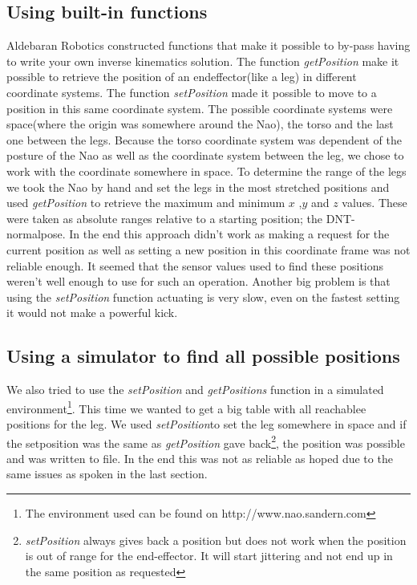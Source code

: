 \documentclass[a4paper]{article}
\begin{document}
\subsection{Using built-in functions}
Aldebaran Robotics constructed functions that make it possible to by-pass having
to write your own inverse kinematics solution. The function \emph{getPosition}
make it possible to retrieve the position of an endeffector(like a leg) in
different coordinate systems. The function  \emph{setPosition} made it possible
to move to a position in this same coordinate system. The possible coordinate
systems were space(where the origin was somewhere around the Nao), the torso
and the last one between the legs. Because the torso coordinate system was
dependent of the posture of the Nao as well as the coordinate system between
the leg, we chose to work with the coordinate somewhere in space.
To determine the range of the legs we took the Nao by hand and set the legs in
the most stretched positions and used \emph{getPosition} to retrieve the
maximum and minimum $x$ ,$y$ and $z$ values.  These were taken as absolute
ranges relative to a starting position; the DNT-normalpose.
In the end this approach didn't work as making a request for the current
position as well as setting a new position in this coordinate frame was not
reliable enough. It seemed that the sensor values used to find these positions
weren't well enough to use for such an operation. Another big problem is that
using the \emph{setPosition} function actuating is very slow, even on the
fastest
setting it would not make a powerful kick.

\subsection{Using a simulator to find all possible positions}
We also tried to use the \emph{setPosition} and \emph{getPositions} function in
a simulated environment\footnote{The environment used can be found on
http://www.nao.sandern.com}. This time we wanted to get a big table with all
reachablee positions for the leg. We used \emph{setPosition}to set the leg
somewhere in space and if the setposition was the same as \emph{getPosition}
gave back\footnote{\emph{setPosition} always gives back a position but does not
work when the position is out of range for the end-effector. It will start
jittering and not end up in the same position as requested}, the position was possible and was written to file.
In the end this was not as reliable as hoped due to the same issues as spoken in
the last section.
\end{document}
